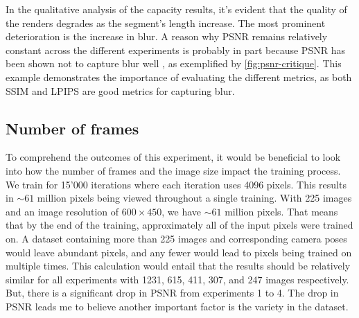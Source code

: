 In the qualitative analysis of the capacity results, it's evident that the quality of the renders degrades as the segment's length increase. The most prominent deterioration is the increase in blur. A reason why PSNR remains relatively constant across the different experiments is probably in part because PSNR has been shown not to capture blur well \cite{videoprocessingai}, as exemplified by \autoref{fig:psnr-critique}. This example demonstrates the importance of evaluating the different metrics, as both SSIM and LPIPS are good metrics for capturing blur.



















\subsection{Number of frames}


To comprehend the outcomes of this experiment, it would be beneficial to look into how the number of frames and the image size impact the training process. We train for 15'000 iterations where each iteration uses 4096 pixels. This results in $\sim61$ million pixels being viewed throughout a single training. With 225 images and an image resolution of $600 \times 450$, we have $\sim61$ million pixels. That means that by the end of the training, approximately all of the input pixels were trained on. A dataset containing more than 225 images and corresponding camera poses would leave abundant pixels, and any fewer would lead to pixels being trained on multiple times. This calculation would entail that the results should be relatively similar for all experiments with 1231, 615, 411, 307, and 247 images respectively. But, there is a significant drop in PSNR from experiments 1 to 4. The drop in PSNR leads me to believe another important factor is the variety in the dataset.














